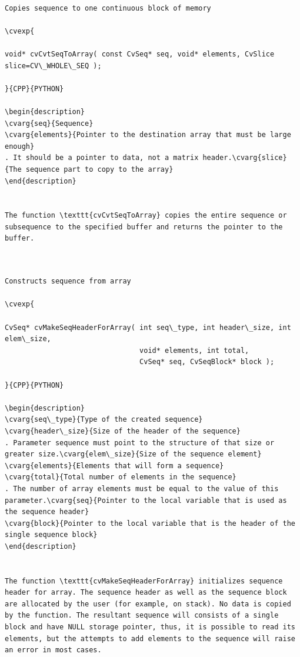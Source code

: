 \label{CvtSeqToArray}
\begin{verbatim}

Copies sequence to one continuous block of memory

\cvexp{

void* cvCvtSeqToArray( const CvSeq* seq, void* elements, CvSlice slice=CV\_WHOLE\_SEQ );

}{CPP}{PYTHON}

\begin{description}
\cvarg{seq}{Sequence}
\cvarg{elements}{Pointer to the destination array that must be large enough}
. It should be a pointer to data, not a matrix header.\cvarg{slice}{The sequence part to copy to the array}
\end{description}


The function \texttt{cvCvtSeqToArray} copies the entire sequence or subsequence to the specified buffer and returns the pointer to the buffer.


\end{verbatim}
\label{MakeSeqHeaderForArray}
\begin{verbatim}

Constructs sequence from array

\cvexp{

CvSeq* cvMakeSeqHeaderForArray( int seq\_type, int header\_size, int elem\_size,
                                void* elements, int total,
                                CvSeq* seq, CvSeqBlock* block );

}{CPP}{PYTHON}

\begin{description}
\cvarg{seq\_type}{Type of the created sequence}
\cvarg{header\_size}{Size of the header of the sequence}
. Parameter sequence must point to the structure of that size or greater size.\cvarg{elem\_size}{Size of the sequence element}
\cvarg{elements}{Elements that will form a sequence}
\cvarg{total}{Total number of elements in the sequence}
. The number of array elements must be equal to the value of this parameter.\cvarg{seq}{Pointer to the local variable that is used as the sequence header}
\cvarg{block}{Pointer to the local variable that is the header of the single sequence block}
\end{description}


The function \texttt{cvMakeSeqHeaderForArray} initializes sequence header for array. The sequence header as well as the sequence block are allocated by the user (for example, on stack). No data is copied by the function. The resultant sequence will consists of a single block and have NULL storage pointer, thus, it is possible to read its elements, but the attempts to add elements to the sequence will raise an error in most cases.


\end{verbatim}
